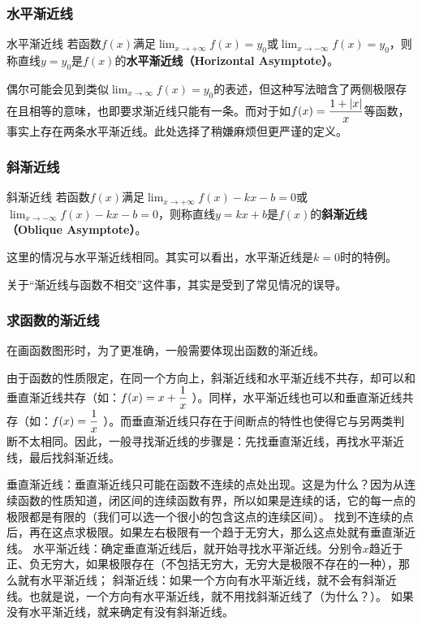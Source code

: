 \subsubsection{水平渐近线}

\begin{definition}{水平渐近线}
若函数$f(x)$满足$\displaystyle \lim_{x\to +\infty}f(x)=y_0$或$\displaystyle \lim_{x\to -\infty}f(x)=y_0$，则称直线$y=y_0$是$f(x)$的\textbf{水平渐近线（Horizontal Asymptote）}。
\end{definition}

偶尔可能会见到类似$\displaystyle \lim_{x\to \infty}f(x)=y_0$的表述，但这种写法暗含了两侧极限存在且相等的意味，也即要求渐近线只能有一条。而对于如$\displaystyle f(x)={1+|x|\over x}$等函数，事实上存在两条水平渐近线。此处选择了稍嫌麻烦但更严谨的定义。

\subsubsection{斜渐近线}

\begin{definition}{斜渐近线}
若函数$f(x)$满足$\displaystyle \lim_{x\to +\infty}f(x)-kx-b=0$或$\displaystyle \lim_{x\to -\infty}f(x)-kx-b=0$，则称直线$y=kx+b$是$f(x)$的\textbf{斜渐近线（Oblique Asymptote）}。
\end{definition}

这里的情况与水平渐近线相同。其实可以看出，水平渐近线是$k=0$时的特例。

关于“渐近线与函数不相交”这件事，其实是受到了常见情况的误导。

\subsubsection{求函数的渐近线}

在画函数图形时，为了更准确，一般需要体现出函数的渐近线。

由于函数的性质限定，在同一个方向上，斜渐近线和水平渐近线不共存，却可以和垂直渐近线共存（如：$\displaystyle f(x)=x+{1\over x}$ ）。同样，水平渐近线也可以和垂直渐近线共存（如：$\displaystyle f(x)={1\over x}$ ）。而垂直渐近线只存在于间断点的特性也使得它与另两类判断不太相同。因此，一般寻找渐近线的步骤是：先找垂直渐近线，再找水平渐近线，最后找斜渐近线。

垂直渐近线：垂直渐近线只可能在函数不连续的点处出现。这是为什么？因为从连续函数的性质知道，闭区间的连续函数有界，所以如果是连续的话，它的每一点的极限都是有限的（我们可以选一个很小的包含这点的连续区间）。
找到不连续的点后，再在这点求极限。如果左右极限有一个趋于无穷大，那么这点处就有垂直渐近线。
水平渐近线：确定垂直渐近线后，就开始寻找水平渐近线。分别令$x$趋近于正、负无穷大，如果极限存在（不包括无穷大，无穷大是极限不存在的一种），那么就有水平渐近线；
斜渐近线：如果一个方向有水平渐近线，就不会有斜渐近线。也就是说，一个方向有水平渐近线，就不用找斜渐近线了（为什么？）。 如果没有水平渐近线，就来确定有没有斜渐近线。



